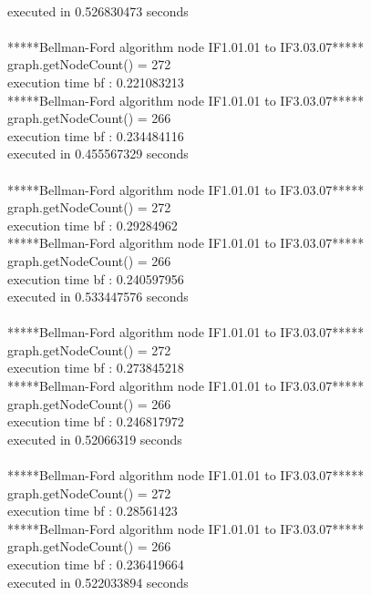 \\executed in 0.526830473 seconds
\\
\\*****Bellman-Ford algorithm node IF1.01.01 to IF3.03.07*****
\\graph.getNodeCount() = 272
\\execution time bf : 0.221083213
\\*****Bellman-Ford algorithm node IF1.01.01 to IF3.03.07*****
\\graph.getNodeCount() = 266
\\execution time bf : 0.234484116
\\executed in 0.455567329 seconds
\\
\\*****Bellman-Ford algorithm node IF1.01.01 to IF3.03.07*****
\\graph.getNodeCount() = 272
\\execution time bf : 0.29284962
\\*****Bellman-Ford algorithm node IF1.01.01 to IF3.03.07*****
\\graph.getNodeCount() = 266
\\execution time bf : 0.240597956
\\executed in 0.533447576 seconds
\\
\\*****Bellman-Ford algorithm node IF1.01.01 to IF3.03.07*****
\\graph.getNodeCount() = 272
\\execution time bf : 0.273845218
\\*****Bellman-Ford algorithm node IF1.01.01 to IF3.03.07*****
\\graph.getNodeCount() = 266
\\execution time bf : 0.246817972
\\executed in 0.52066319 seconds
\\
\\*****Bellman-Ford algorithm node IF1.01.01 to IF3.03.07*****
\\graph.getNodeCount() = 272
\\execution time bf : 0.28561423
\\*****Bellman-Ford algorithm node IF1.01.01 to IF3.03.07*****
\\graph.getNodeCount() = 266
\\execution time bf : 0.236419664
\\executed in 0.522033894 seconds
\\\\
